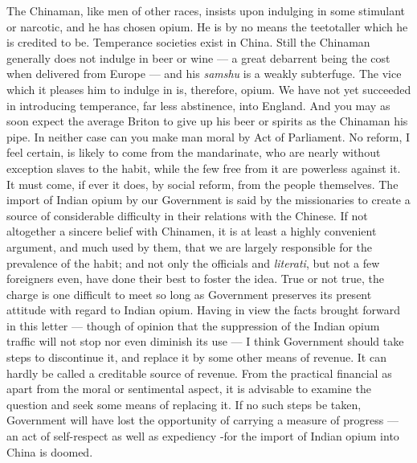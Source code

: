 \begin{fancyquote}
	The Chinaman, like men of other races, insists upon indulging in some stimulant or narcotic, and he has chosen opium. He is by no means the teetotaller which he is credited to be. Temperance societies exist in China. Still the Chinaman generally does not indulge in beer or wine --- a great debarrent being the cost when delivered from Europe --- and his \textit{samshu} is a weakly subterfuge. The vice which it pleases him to indulge in is, therefore, opium. We have not yet succeeded in introducing temperance, far less abstinence, into England. And you may as soon expect the average Briton to give up his beer or spirits as the Chinaman his pipe. In neither case can you make man moral by Act of Parliament. No reform, I feel certain, is likely to come from the mandarinate, who are nearly without exception slaves to the habit, while the few free from it are powerless against it. It must come, if ever it does, by social reform, from the people themselves. The import of Indian opium by our Government is said by the missionaries to create a source of considerable difficulty in their relations with the Chinese. If not altogether a sincere belief with Chinamen, it is at least a highly convenient argument, and much used by them, that we are largely responsible for the prevalence of the habit; and not only the officials and \textit{literati}, but not a few foreigners even, have done their best to foster the idea. True or not true, the charge is one difficult to meet so long as Government preserves its present attitude with regard to Indian opium. Having in view the facts brought forward in this letter --- though of opinion that the suppression of the Indian opium traffic will not stop nor even diminish its use --- I think Government should take steps to discontinue it, and replace it by some other means of revenue. It can hardly be called a creditable source of revenue. From the practical financial as apart from the moral or sentimental aspect, it is advisable to examine the question and seek some means of replacing it. If no such steps be taken, Government will have lost the opportunity of carrying a measure of progress --- an act of self-respect as well as expediency -for the import of Indian opium into China is doomed.
	\begin{flushright}
		\emph{\autocite{SpecialCorrespondent:1884}}
	\end{flushright}
\end{fancyquote}
